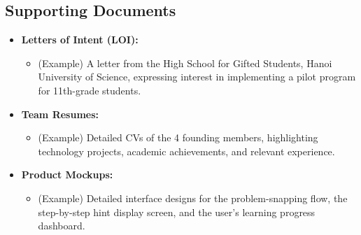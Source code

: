 \subsection{Supporting Documents}
\begin{itemize}
    \item \textbf{Letters of Intent (LOI):}
    \begin{itemize}
        \item (Example) A letter from the High School for Gifted Students, Hanoi University of Science, expressing interest in implementing a pilot program for 11th-grade students.
    \end{itemize}
    \item \textbf{Team Resumes:}
    \begin{itemize}
        \item (Example) Detailed CVs of the 4 founding members, highlighting technology projects, academic achievements, and relevant experience.
    \end{itemize}
    \item \textbf{Product Mockups:}
    \begin{itemize}
        \item (Example) Detailed interface designs for the problem-snapping flow, the step-by-step hint display screen, and the user's learning progress dashboard.
    \end{itemize}
\end{itemize}